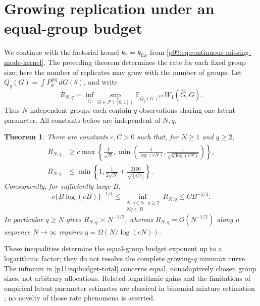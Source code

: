 \documentclass[11pt,letterpaper]{article}
\newtheorem{theorem}{Theorem}[section]
\theoremstyle{definition}
\theoremstyle{remark}
\newcommand{\1}{\mathbf 1}
\begin{document}
\section{Growing replication under an equal-group budget}
\label{p11:sec:replication-budget}

We continue with the factorial kernel
$k_*=k_{\mathrm{fac}}$ from \eqref{p09:eq:continuous-missing-mode-kernel}.
The preceding theorem determines the rate for each fixed group size;
here the number of replicates may grow with the number of groups.
Let $Q_q(G)=\int P_\theta^{\otimes q}\,dG(\theta)$, and write
\[
 R_{N,q}=\inf_{\widehat G}\sup_{G\in\mathcal P([0,1])}
       \mathbb E_{Q_q(G)^{\otimes N}}W_1(\widehat G,G).
\]
Thus $N$ independent groups each contain $q$ observations sharing one
latent parameter.  All constants below are independent of $N,q$.

\begin{theorem}\label{p11:thm:budget-bounds}
There are constants $c,C>0$ such that, for $N\ge1$ and $q\ge2$,
\begin{align}
 R_{N,q}&\ge c\max\left\{\frac1{\sqrt N},
     \min\left(\frac1{\log(eN)},\frac1{\sqrt{q\log(eN)}}\right)\right\},
      \label{p11:eq:budget-lower}\\
 R_{N,q}&\le\min\left\{1,\frac1{2\sqrt N}
                 +\frac{2100}{\sqrt{\lfloor q/2\rfloor}}\right\}.
      \label{p11:eq:budget-upper}
\end{align}
Consequently, for sufficiently large $B$,
\begin{equation}\label{p11:eq:budget-total}
 c\{B\log(eB)\}^{-1/4}
 \le\inf_{\substack{N,q\in\mathbb N,\ q\ge2\\Nq\le B}}R_{N,q}
 \le C B^{-1/4}.
\end{equation}
In particular $q\ge N$ gives $R_{N,q}\asymp N^{-1/2}$, whereas
$R_{N,q}=O(N^{-1/2})$ along a sequence $N\to\infty$ requires
$q=\Omega(N/\log(eN))$.
\end{theorem}

These inequalities determine the equal-group budget exponent up to a
logarithmic factor; they do not resolve the complete growing-$q$
minimax curve.  The infimum in \eqref{p11:eq:budget-total} concerns equal,
nonadaptively chosen group sizes, not arbitrary allocations.
Related logarithmic gains and the limitations of empirical latent
parameter estimates are classical in binomial-mixture estimation
\cite{Vinayak2019}; no novelty of those rate phenomena is asserted.
\end{document}
